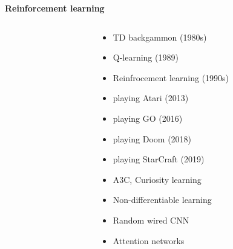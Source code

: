 \documentclass[xcolor=dvipsnames]{beamer}
\begin{document}
\begin{frame}{\bf Reinforcement learning}
\begin{columns}
\begin{column}{0.5\textwidth}
\end{column}
\begin{column}{0.5\textwidth}  %

    \begin{itemize}
        \item TD backgammon (1980s)
        \item Q-learning (1989)
        \item Reinfrocement learning (1990s)
    \end{itemize}

    \begin{itemize}
      \item playing Atari (2013)
      \item playing GO (2016)
      \item playing Doom (2018)
      \item playing StarCraft (2019)
    \end{itemize}

    \begin{itemize}
      \item A3C, Curiosity learning
      \item Non-differentiable learning
      \item Random wired CNN
      \item Attention networks
    \end{itemize}

\end{column}
\end{columns}

\end{frame}
\end{document}
